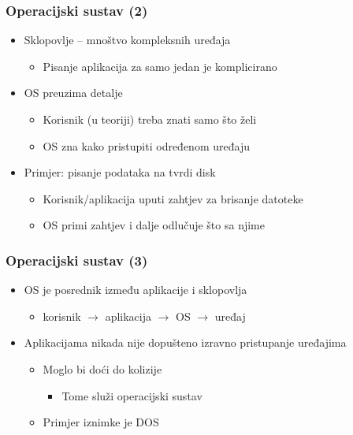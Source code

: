 \documentclass{beamer}
\begin{document}
\begin{frame}[t]
\frametitle{Operacijski sustav (2)}
\begin{itemize}
  \item Sklopovlje – mnoštvo kompleksnih uređaja
   \begin{itemize}
     \item Pisanje aplikacija za samo jedan je komplicirano
   \end{itemize}
  \item OS preuzima detalje 
  \begin{itemize}
    \item Korisnik (u teoriji) treba znati samo što želi
    \item OS zna kako pristupiti određenom uređaju
  \end{itemize}
  \item Primjer: pisanje podataka na tvrdi disk
  \begin{itemize}
    \item Korisnik/aplikacija uputi zahtjev za brisanje datoteke
    \item OS primi zahtjev i dalje odlučuje što sa njime
  \end{itemize}
\end{itemize}
\end{frame}

\begin{frame}[t]
\frametitle{Operacijski sustav (3)}
\begin{itemize}
  \item OS je posrednik između aplikacije i sklopovlja
  \begin{itemize}
    \item korisnik $\rightarrow$ aplikacija $\rightarrow$ OS 
          $\rightarrow$ uređaj
  \end{itemize}
  \item Aplikacijama nikada nije dopušteno izravno pristupanje uređajima
  \begin{itemize}
    \item Moglo bi doći do kolizije
    \begin{itemize}
      \item Tome služi operacijski sustav
    \end{itemize}
    \item Primjer iznimke je DOS
  \end{itemize}
\end{itemize}
\end{frame}
\end{document}
